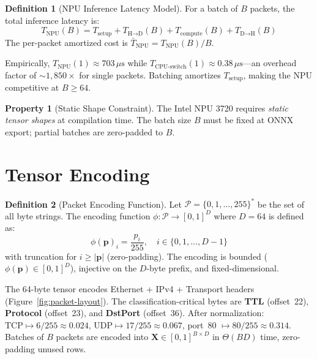 \documentclass[11pt,a4paper,twoside]{article}
\theoremstyle{definition}
\newtheorem{definition}{Definition}[section]
\newtheorem{property}{Property}[section]
\theoremstyle{remark}
\newcommand{\tensor}[1]{\bm{#1}}
\newcommand{\vect}[1]{\mathbf{#1}}
\begin{document}
\begin{definition}[NPU Inference Latency Model]
\label{def:latency}
For a batch of $B$ packets, the total inference latency is:
\begin{equation}
T_{\text{NPU}}(B) = T_{\text{setup}} + T_{\text{H}\to\text{D}}(B) + T_{\text{compute}}(B) + T_{\text{D}\to\text{H}}(B)
\end{equation}
The per-packet amortized cost is $\bar{T}_{\text{NPU}} = T_{\text{NPU}}(B) / B$.
\end{definition}

Empirically, $T_{\text{NPU}}(1) \approx 703\,\mu\text{s}$ while $T_{\text{CPU-switch}}(1) \approx 0.38\,\mu\text{s}$---an overhead factor of ${\sim}1{,}850\times$ for single packets. Batching amortizes $T_{\text{setup}}$, making the NPU competitive at $B \geq 64$.

\begin{property}[Static Shape Constraint]
\label{prop:static}
The Intel NPU 3720 requires \emph{static tensor shapes} at compilation time. The batch size $B$ must be fixed at ONNX export; partial batches are zero-padded to $B$.
\end{property}


\section{Tensor Encoding}
\label{sec:encoding}

\begin{definition}[Packet Encoding Function]
\label{def:encoding}
Let $\mathcal{P} = \{0, 1, \ldots, 255\}^*$ be the set of all byte strings. The encoding function $\phi: \mathcal{P} \to [0,1]^D$ where $D = 64$ is defined as:
\begin{equation}
\phi(\vect{p})_i = \frac{p_i}{255}, \quad i \in \{0, 1, \ldots, D-1\}
\end{equation}
with truncation for $i \geq |\vect{p}|$ (zero-padding). The encoding is bounded ($\phi(\vect{p}) \in [0,1]^D$), injective on the $D$-byte prefix, and fixed-dimensional.
\end{definition}

The 64-byte tensor encodes Ethernet + IPv4 + Transport headers (Figure~\ref{fig:packet-layout}). The classification-critical bytes are \textbf{TTL} (offset~22), \textbf{Protocol} (offset~23), and \textbf{DstPort} (offset~36). After normalization: $\text{TCP} \mapsto 6/255 \approx 0.024$, $\text{UDP} \mapsto 17/255 \approx 0.067$, port~80 $\mapsto 80/255 \approx 0.314$. Batches of $B$ packets are encoded into $\tensor{X} \in [0,1]^{B \times D}$ in $\Theta(BD)$ time, zero-padding unused rows.
\end{document}
